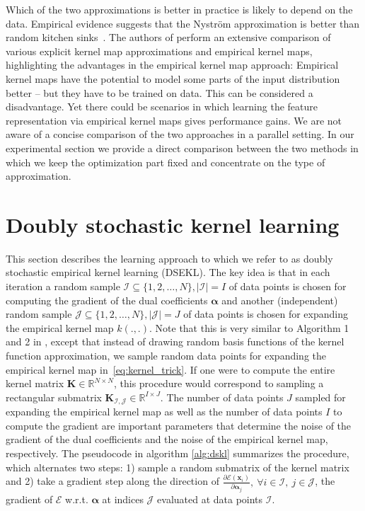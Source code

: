 \documentclass{article} %
\newcommand{\R}{\ensuremath{\mathds{R}}}
\newcommand{\va}{\boldsymbol{\alpha}}
\renewcommand{\vec}[1]{\mathbf{#1}}
\begin{document}
Which of the two approximations is better in practice is likely to depend on the data. Empirical evidence suggests that the Nystr\"om approximation is better than random kitchen sinks~\cite{Yang2012}. The authors of \cite{Vedaldi2010} perform an extensive comparison of various explicit kernel map approximations and empirical kernel maps, highlighting the advantages in the empirical kernel map approach: Empirical kernel maps have the potential to model some parts of the input distribution better -- but they have to be trained on data. This can be considered a disadvantage. Yet there could be scenarios in which learning the feature representation via empirical kernel maps gives performance gains. We are not aware of a concise comparison of the two approaches in a parallel setting. In our experimental section we provide a direct comparison between the two methods in which we keep the optimization part fixed and concentrate on the type of approximation. 
%
\section{Doubly stochastic kernel learning}\label{sec:dskl}
This section describes the learning approach to which we refer to as doubly stochastic empirical kernel learning (DSEKL). The key idea is that in each iteration a random sample $\mathcal{I}\subseteq\{1,2,\dots,N\}, |\mathcal{I}|=I$ of data points is chosen for computing the gradient of the dual coefficients $\va$ and another (independent) random sample $\mathcal{J}\subseteq\{1,2,\dots,N\}, |\mathcal{J}|=J$ of data points is chosen for expanding the empirical kernel map $k(.,.)$. Note that this is very similar to Algorithm 1 and 2 in \cite{Dai2014}, except that instead of drawing random basis functions of the kernel function approximation, we sample random data points for expanding the empirical kernel map in~\autoref{eq:kernel_trick}. If one were to compute the entire kernel matrix $\vec{K}\in\R^{N\times N}$, this procedure would correspond to sampling a rectangular submatrix $\vec{K}_{\mathcal{I,J}}\in\R^{I\times J}$. The number of data points $J$ sampled for expanding the empirical kernel map as well as the number of data points $I$ to compute the gradient are important parameters that determine the noise of the gradient of the dual coefficients and the noise of the empirical kernel map, respectively. The pseudocode in algorithm \autoref{alg:dskl} summarizes the procedure, which alternates two steps: 1) sample a random submatrix of the kernel matrix and 2) take a gradient step along the direction of $\frac{\partial\mathcal{E}(\vec{x}_i)}{\partial \va_{j}},~\forall i\in \mathcal{I},~j\in\mathcal{J} $, the gradient of $\mathcal{E}$ w.r.t. $\va$ at indices $\mathcal{J}$ evaluated at data points $\mathcal{I}$.
\end{document}
